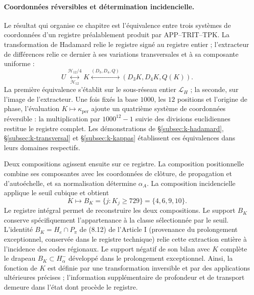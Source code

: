 \paragraph{Coordonnées réversibles et détermination incidencielle.}
\label{ampl-alfa-k-intro-reversible}
Le résultat qui organise ce chapitre est l'équivalence entre trois
systèmes de coordonnées d'un registre préalablement produit par
APP--TRIT--TPK. La transformation de Hadamard relie le registre
signé au registre entier ; l'extracteur de différences relie
ce dernier à ses variations transversales et à sa composante uniforme :
\[
 U\underset{\mathcal H_{12}}{\overset{\mathcal H_{12}/4}{\longleftrightarrow}}K
 \overset{(D_3,D_4,Q)}{\longleftrightarrow}
 (D_3K,D_4K,Q(K)).
\]
La première équivalence s'établit sur le sous-réseau entier
$\mathcal L_H$ ; la seconde, sur l'image de l'extracteur. Une fois fixés la
base $1000$, les $12$ positions et l'origine de phase, l'évaluation
$K\mapsto\kappa_{\mathrm{per}}$ ajoute un quatrième système de coordonnées
réversible : la multiplication par $1000^{12}-1$ suivie des divisions
euclidiennes restitue le registre complet. Les démonstrations de
\S\ref{subsec:k-hadamard}, \S\ref{subsec:k-transversal} et
\S\ref{subsec:k-kappas} établissent ces équivalences dans leurs domaines
respectifs.

Deux compositions agissent ensuite sur ce registre. La composition
positionnelle combine ses composantes avec les coordonnées de clôture,
de propagation et d'autoéchelle, et sa normalisation détermine $\alpha_A$. La
composition incidencielle applique le seuil cubique et obtient
\[
 K\longmapsto B_K=\{j:K_j\geq729\}=\{4,6,9,10\}.
\]
Le registre intégral permet de reconstruire les deux compositions. Le support
$B_K$ conserve spécifiquement l'appartenance à la classe sélectionnée
par le seuil. L'identité $B_K=H_e\cap P_\pi$ de
(8.12) de l'Article I (provenance du prolongement exceptionnel, conservée dans le registre technique) relie cette extraction entière à l'incidence
des codes régionaux. Le support négatif de son bilan avec $K$
complète le drapeau $B_K\subset H^-_\alpha$ développé dans le
prolongement exceptionnel. Ainsi, la fonction de $K$ est définie par
une transformation inversible et par des applications ultérieures
précises ; l'information supplémentaire de profondeur et de transport demeure
dans l'état dont procède le registre.

